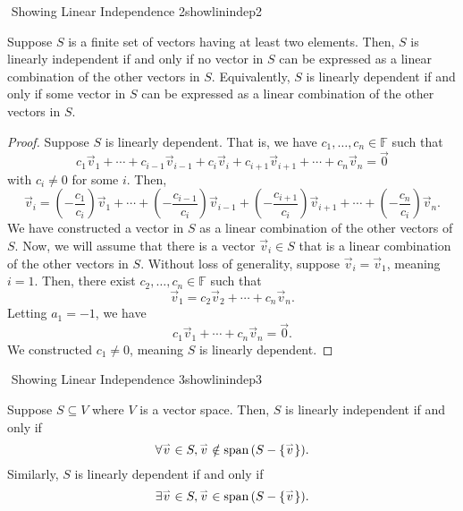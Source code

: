         \begin{theorem}{\Stop\,\,Showing Linear Independence 2}{showlinindep2}
            
            Suppose \(S\) is a finite set of vectors having at least two elements. Then, \(S\) is linearly independent if and only if no vector in \(S\) can be expressed as a linear combination of the other vectors in \(S\). Equivalently, \(S\) is linearly dependent if and only if some vector in \(S\) can be expressed as a linear combination of the other vectors in \(S\).
            \begin{proof}
                Suppose \(S\) is linearly dependent. That is, we have \(c_1,\ldots,c_n\in\mathbb{F}\) such that
                \begin{equation*}
                    c_1\vec{v}_1+\cdots+c_{i-1}\vec{v}_{i-1}+c_i\vec{v}_i+c_{i+1}\vec{v}_{i+1}+\cdots+c_n\vec{v}_n=\vec{0}
                \end{equation*}
                with \(c_i\neq0\) for some \(i\). Then,
                \begin{equation*}
                    \vec{v}_i=\left(-\frac{c_1}{c_i}\right)\vec{v}_1+\cdots+\left(-\frac{c_{i-1}}{c_i}\right)\vec{v}_{i-1}+\left(-\frac{c_{i+1}}{c_i}\right)\vec{v}_{i+1}+\cdots+\left(-\frac{c_n}{c_i}\right)\vec{v}_n.
                \end{equation*}
                We have constructed a vector in \(S\) as a linear combination of the other vectors of \(S\). Now, we will assume that there is a vector \(\vec{v}_i\in S\) that is a linear combination of the other vectors in \(S\). Without loss of generality, suppose \(\vec{v}_i=\vec{v}_1\), meaning \(i=1\). Then, there exist \(c_2,\ldots,c_n\in\mathbb{F}\) such that
                \begin{equation*}
                    \vec{v}_1=c_2\vec{v}_2+\cdots+c_n\vec{v}_n.
                \end{equation*}
                Letting \(a_1=-1\), we have
                \begin{equation*}
                    c_1\vec{v}_1+\cdots+c_n\vec{v}_n=\vec{0}.
                \end{equation*}
                We constructed \(c_1\neq0\), meaning \(S\) is linearly dependent.
            \end{proof}
        \end{theorem}
        \begin{theorem}{\Stop\,\,Showing Linear Independence 3}{showlinindep3}
            
            Suppose \(S\subseteq V\) where \(V\) is a vector space. Then, \(S\) is linearly independent if and only if
            \begin{equation*}
                \forall\overset{_{\rightharpoonup}}{v}\in S,\overset{_{\rightharpoonup}}{v}\notin\text{span\,}(S-\{\overset{_{\rightharpoonup}}{v}\}).
            \end{equation*}
            Similarly, \(S\) is linearly dependent if and only if
            \begin{equation*}
                \exists\overset{_{\rightharpoonup}}{v}\in S,\overset{_{\rightharpoonup}}{v}\in\text{span\,}(S-\{\overset{_{\rightharpoonup}}{v}\}).
            \end{equation*}

        \end{theorem}
